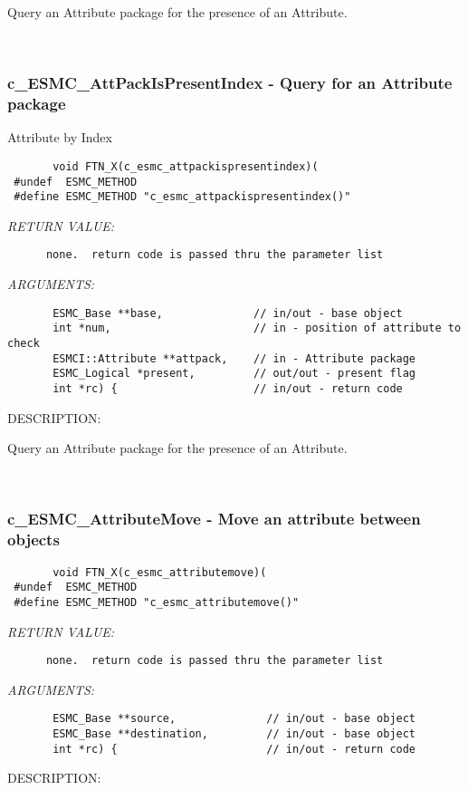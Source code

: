        Query an Attribute package for the presence of an Attribute.
   
 
\mbox{}\hrulefill\ 
 
\subsubsection [c\_ESMC\_AttPackIsPresentIndex] {c\_ESMC\_AttPackIsPresentIndex - Query for an Attribute package}


                                              Attribute by Index
  
\begin{verbatim}       void FTN_X(c_esmc_attpackispresentindex)(
 #undef  ESMC_METHOD
 #define ESMC_METHOD "c_esmc_attpackispresentindex()"\end{verbatim}{\em RETURN VALUE:}
\begin{verbatim}      none.  return code is passed thru the parameter list
   \end{verbatim}{\em ARGUMENTS:}
\begin{verbatim}       ESMC_Base **base,              // in/out - base object
       int *num,                      // in - position of attribute to check
       ESMCI::Attribute **attpack,    // in - Attribute package
       ESMC_Logical *present,         // out/out - present flag
       int *rc) {                     // in/out - return code
 \end{verbatim}
{\sf DESCRIPTION:\\ }


       Query an Attribute package for the presence of an Attribute.
   
 
\mbox{}\hrulefill\ 
 
\subsubsection [c\_ESMC\_AttributeMove] {c\_ESMC\_AttributeMove - Move an attribute between objects}


  
\begin{verbatim}       void FTN_X(c_esmc_attributemove)(
 #undef  ESMC_METHOD
 #define ESMC_METHOD "c_esmc_attributemove()"\end{verbatim}{\em RETURN VALUE:}
\begin{verbatim}      none.  return code is passed thru the parameter list\end{verbatim}{\em ARGUMENTS:}
\begin{verbatim}       ESMC_Base **source,              // in/out - base object
       ESMC_Base **destination,         // in/out - base object
       int *rc) {                       // in/out - return code
   \end{verbatim}
{\sf DESCRIPTION:\\ }


